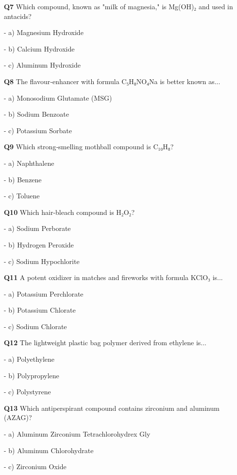 \textbf{Q7} Which compound, known as "milk of magnesia," is Mg(OH)₂ and used in antacids?\par
\quad - a) Magnesium Hydroxide\par
\quad - b) Calcium Hydroxide\par
\quad - c) Aluminum Hydroxide\par

\textbf{Q8} The flavour‑enhancer with formula C₅H₈NO₄Na is better known as...\par
\quad - a) Monosodium Glutamate (MSG)\par
\quad - b) Sodium Benzoate\par
\quad - c) Potassium Sorbate\par

\textbf{Q9} Which strong‑smelling mothball compound is C₁₀H₈?\par
\quad - a) Naphthalene\par
\quad - b) Benzene\par
\quad - c) Toluene\par

\textbf{Q10} Which hair‑bleach compound is H₂O₂?\par
\quad - a) Sodium Perborate\par
\quad - b) Hydrogen Peroxide\par
\quad - c) Sodium Hypochlorite\par

\textbf{Q11} A potent oxidizer in matches and fireworks with formula KClO₃ is...\par
\quad - a) Potassium Perchlorate\par
\quad - b) Potassium Chlorate\par
\quad - c) Sodium Chlorate\par

\textbf{Q12} The lightweight plastic bag polymer derived from ethylene is...\par
\quad - a) Polyethylene\par
\quad - b) Polypropylene\par
\quad - c) Polystyrene\par

\textbf{Q13} Which antiperspirant compound contains zirconium and aluminum (AZAG)?\par
\quad - a) Aluminum Zirconium Tetrachlorohydrex Gly\par
\quad - b) Aluminum Chlorohydrate\par
\quad - c) Zirconium Oxide\par

